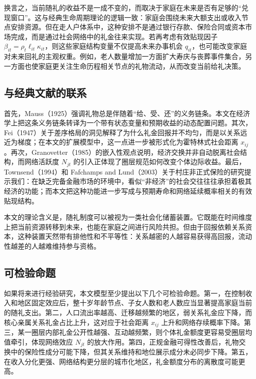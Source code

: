 \documentclass[12pt,a4paper]{ctexart}
\begin{document}
换言之，当前随礼的收益不是一成不变的，而取决于家庭在未来是否有足够的“兑现窗口”。这与经典生命周期理论的逻辑一致：家庭会围绕未来大额支出或收入节点安排资源。但在走人户体系中，这种安排不是通过银行存款、保险合同或资本市场完成，而是通过社会网络中的礼金往来实现。若再考虑有效贴现因子 $\beta_{it}=\rho_t\ell_{it}\kappa_{it}$，则这些家庭结构变量不仅提高未来办事机会 $q_{it}$，也可能改变家庭对未来回礼的主观权重。例如，老人数量增加一方面扩大寿庆与丧葬事件集合，另一方面也使家庭更关注生命历程相关节点的礼物流动，从而改变当前给礼决策。

\subsection{与经典文献的联系}

首先，Mauss（1925）强调礼物总是伴随着“给、受、还”的义务链条。本文在经济学上把这条义务链条转译为一个带有状态变量和预期收益的动态配置问题。其次，Fei（1947）关于差序格局的洞见解释了为什么礼金回报并不均匀，而是以关系远近为梯度；在本文的扩展模型中，这一点进一步被形式化为霍特林式社会距离 $x_{ij}$。再次，Granovetter（1985）的嵌入性观点说明，经济交换并非自动脱离社会结构，而网络活跃度 $N_{jt}$ 的引入正体现了圈层规范如何改变个体边际收益。最后，Townsend（1994）和 Fafchamps and Lund（2003）关于村庄非正式保险的研究提示我们：在缺乏完备金融市场的环境中，看似“非经济”的社会交往往往承担着极其经济的功能；而本文把这种功能进一步写成与预期寿命和网络延续概率相关的有效贴现结构。

本文的理论含义是，随礼制度可以被视为一类社会化储蓄装置。它既能在时间维度上把当前资源转移到未来，也能在家庭之间进行风险共担。但由于回报依赖关系资本，这种装置天然带有排他性和不平等性：关系越密的人越容易获得高回报，流动性越差的人越难维持参与资格。

\subsection{可检验命题}

如果将来进行经验研究，本文模型至少提出以下几个可检验命题。第一，在控制收入和地区固定效应后，整十岁年龄节点、子女人数和老人数应当显著提高家庭当前的随礼支出。第二，人口流出率越高、迁移越频繁的地区，弱关系礼金应下降，而核心亲属关系礼金占比上升，这对应于社会距离 $x_{ij}$ 上升和网络存续概率下降。第三，某一圈层内部礼金公开性越强、互动越频繁，则个体礼金额度更容易受圈层均值牵引，体现网络效应 $N_{jt}$ 的放大作用。第四，正规金融可得性改善后，礼物交换中的保险性成分可能下降，但其关系维持和地位展示成分未必同步下降。第五，在收入分化更强、网络结构更分层的城市化地区，礼金额度分布的离散度可能更高。
\end{document}

